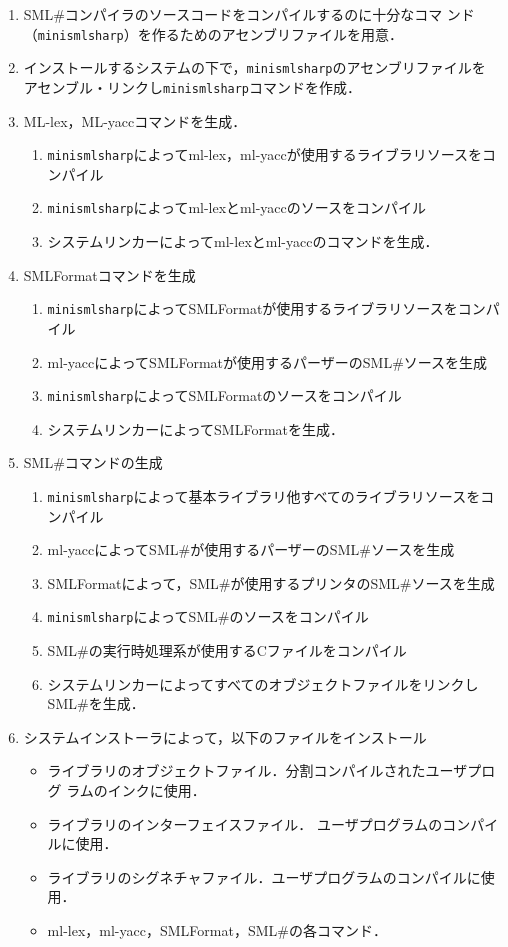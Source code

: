 \documentclass{jbook}
\newcommand{\smlsharp}{SML\#}
\begin{document}
\begin{enumerate}
\item \smlsharp{}コンパイラのソースコードをコンパイルするのに十分なコマ
ンド（{\tt minismlsharp}）を作るためのアセンブリファイルを用意．
\item インストールするシステムの下で，{\tt minismlsharp}のアセンブリファイルを
アセンブル・リンクし{\tt minismlsharp}コマンドを作成．
\item ML-lex，ML-yaccコマンドを生成．
\begin{enumerate}
\item {\tt minismlsharp}によってml-lex，ml-yaccが使用するライブラリソースをコンパイル
\item {\tt minismlsharp}によってml-lexとml-yaccのソースをコンパイル
\item システムリンカーによってml-lexとml-yaccのコマンドを生成．
\end{enumerate}
\item SMLFormatコマンドを生成
\begin{enumerate}
\item {\tt minismlsharp}によってSMLFormatが使用するライブラリソースをコンパイル
\item ml-yaccによってSMLFormatが使用するパーザーの\smlsharp{}ソースを生成
\item {\tt minismlsharp}によってSMLFormatのソースをコンパイル
\item システムリンカーによってSMLFormatを生成．
\end{enumerate}
\item \smlsharp{}コマンドの生成
\begin{enumerate}
\item {\tt minismlsharp}によって基本ライブラリ他すべてのライブラリソースをコンパイル
\item ml-yaccによって\smlsharp{}が使用するパーザーの\smlsharp{}ソースを生成
\item SMLFormatによって，\smlsharp{}が使用するプリンタの\smlsharp{}ソースを生成
\item {\tt minismlsharp}によって\smlsharp{}のソースをコンパイル
\item \smlsharp{}の実行時処理系が使用するCファイルをコンパイル
\item システムリンカーによってすべてのオブジェクトファイルをリンクし\smlsharp{}を生成．
\end{enumerate}
\item システムインストーラによって，以下のファイルをインストール
\begin{itemize}
\item ライブラリのオブジェクトファイル．分割コンパイルされたユーザプログ
ラムのインクに使用．
\item ライブラリのインターフェイスファイル．
ユーザプログラムのコンパイルに使用．
\item ライブラリのシグネチャファイル．ユーザプログラムのコンパイルに使用．
\item ml-lex，ml-yacc，SMLFormat，\smlsharp{}の各コマンド．
\end{itemize}
\end{enumerate}
\end{document}
